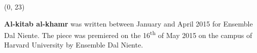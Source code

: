 \documentclass[10pt]{article}
\begin{document}
\begin{textblock}{23}
\end{textblock}

\begin{textblock}{23}(0, 23)

\textbf{Al-kitab al-khamr} was written between January and April 2015 for
Ensemble Dal Niente. The piece was premiered on the 16\textsuperscript{th} of
May 2015 on the campus of Harvard University by Ensemble Dal Niente.

\end{textblock}
\end{document}
